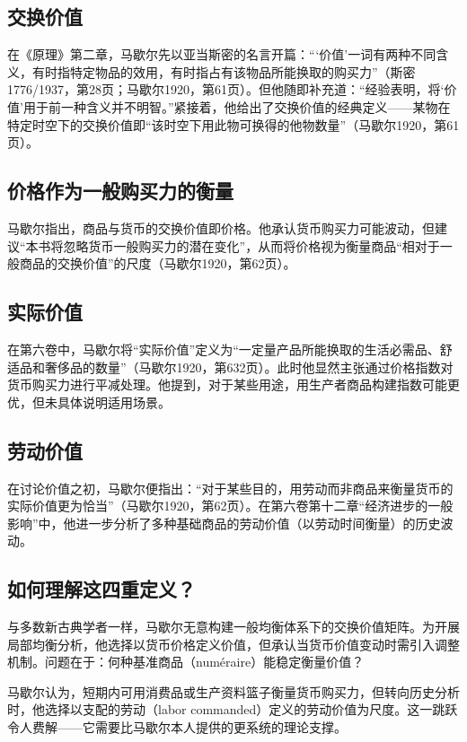 \begin{translation}
\subsection{交换价值}

在《原理》第二章，马歇尔先以亚当斯密的名言开篇：“‘价值’一词有两种不同含义，有时指特定物品的效用，有时指占有该物品所能换取的购买力”（斯密1776/1937，第28页；马歇尔1920，第61页）。但他随即补充道：“经验表明，将‘价值’用于前一种含义并不明智。”紧接着，他给出了交换价值的经典定义——某物在特定时空下的交换价值即“该时空下用此物可换得的他物数量”（马歇尔1920，第61页）。

\subsection{价格作为一般购买力的衡量}

马歇尔指出，商品与货币的交换价值即价格。他承认货币购买力可能波动，但建议“本书将忽略货币一般购买力的潜在变化”，从而将价格视为衡量商品“相对于一般商品的交换价值”的尺度（马歇尔1920，第62页）。

\subsection{实际价值}

在第六卷中，马歇尔将“实际价值”定义为“一定量产品所能换取的生活必需品、舒适品和奢侈品的数量”（马歇尔1920，第632页）。此时他显然主张通过价格指数对货币购买力进行平减处理。他提到，对于某些用途，用生产者商品构建指数可能更优，但未具体说明适用场景。

\subsection{劳动价值}

在讨论价值之初，马歇尔便指出：“对于某些目的，用劳动而非商品来衡量货币的实际价值更为恰当”（马歇尔1920，第62页）。在第六卷第十二章“经济进步的一般影响”中，他进一步分析了多种基础商品的劳动价值（以劳动时间衡量）的历史波动。

\subsection{如何理解这四重定义？}

与多数新古典学者一样，马歇尔无意构建一般均衡体系下的交换价值矩阵。为开展局部均衡分析，他选择以货币价格定义价值，但承认当货币价值变动时需引入调整机制。问题在于：何种基准商品（numéraire）能稳定衡量价值？

马歇尔认为，短期内可用消费品或生产资料篮子衡量货币购买力，但转向历史分析时，他选择以支配的劳动（labor commanded）定义的劳动价值为尺度。这一跳跃令人费解——它需要比马歇尔本人提供的更系统的理论支撑。


\end{translation}

